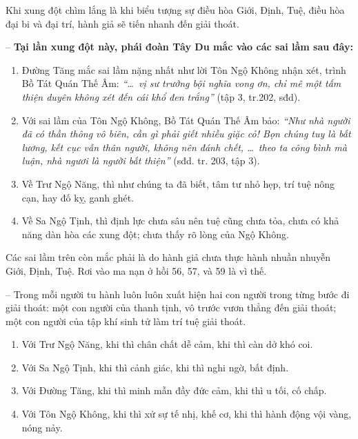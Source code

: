Khi xung đột chìm lắng là khi biểu tượng sự điều hòa Giới, Định, Tuệ, điều hòa đại bi và đại trí, hành giả sẽ tiến nhanh đến giải thoát.

-- {\bf Tại lần xung đột này, phái đoàn Tây Du mắc vào các sai lầm sau đây:}

\begin{enumerate}[label=\itshape\alph*\upshape/]
    \item Đường Tăng mắc sai lầm nặng nhất như lời Tôn Ngộ Không nhận xét, trình Bồ Tát Quán Thế Âm: \emph{``\ldots ~vị sư trưởng bội nghĩa vong ơn, chỉ mê một tấm thiện duyên không xét đến cái khổ đen trắng''} (tập 3, tr.202, sđd).

    \item Với sai lầm của Tôn Ngộ Không, Bồ Tát Quán Thế Âm bảo: \emph{``Như nhà người đã có thần thông vô biên, cần gì phải giết nhiều giặc cỏ! Bọn chúng tuy là bất lương, kết cục vẫn thân người, không nên đánh chết, \ldots ~theo ta công bình mà luận, nhà ngươi là người bất thiện''} (sđd. tr. 203, tập 3).

    \item Về Trư Ngộ Năng, thì như chúng ta đã biết, tâm tư nhỏ hẹp, trí tuệ nông cạn, hay đố kỵ, ganh ghét.

    \item Về Sa Ngộ Tịnh, thì định lực chưa sâu nên tuệ cũng chưa tỏa, chưa có khả năng dàn hòa các xung đột; chưa thấy rõ lòng của Ngộ Không.
\end{enumerate}

Các sai lầm trên còn mắc phải là do hành giả chưa thực hành nhuần nhuyễn Giới, Định, Tuệ. Rơi vào ma nạn ở hồi 56, 57, và 59 là vì thế.

-- Trong mỗi người tu hành luôn luôn xuất hiện hai con người trong từng bước đi giải thoát: một con người của thanh tịnh, vô trước vươn thẳng đến giải thoát; một con người của tập khí sinh tử làm trí tuệ giải thoát.

\begin{enumerate}[label=\itshape\alph*\upshape/]
    \item Với Trư Ngộ Năng, khi thì chân chất dễ cảm, khi thì càn dở khó coi.

    \item Với Sa Ngộ Tịnh, khi thì cảnh giác, khi thì nghi ngờ, bất định.

    \item Với Đường Tăng, khi thì minh mẫn đầy đức cảm, khi thì u tối, cố chấp.

    \item Với Tôn Ngộ Không, khi thì xử sự tế nhị, khế cơ, khi thì hành động vội vàng, nóng nảy.
\end{enumerate}

